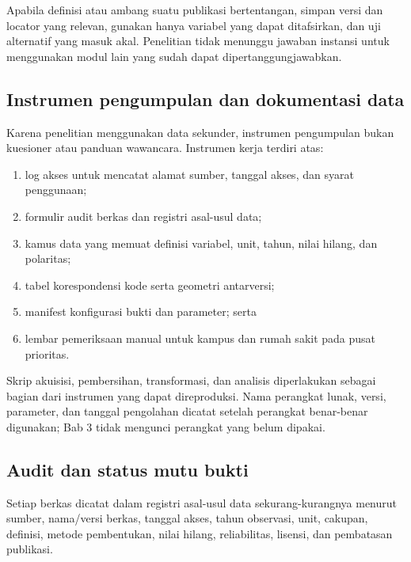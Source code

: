 \documentclass[11pt,a4paper,oneside,openany,indonesian]{report}
\begin{document}
Apabila definisi atau ambang suatu publikasi bertentangan, simpan versi
dan locator yang relevan, gunakan hanya variabel yang dapat ditafsirkan,
dan uji alternatif yang masuk akal. Penelitian tidak menunggu jawaban
instansi untuk menggunakan modul lain yang sudah dapat
dipertanggungjawabkan.

\subsection{Instrumen pengumpulan dan dokumentasi
data}\label{instrumen-pengumpulan-dan-dokumentasi-data}

Karena penelitian menggunakan data sekunder, instrumen pengumpulan bukan
kuesioner atau panduan wawancara. Instrumen kerja terdiri atas:

\begin{enumerate}
\def\labelenumi{\arabic{enumi}.}
\tightlist
\item
  log akses untuk mencatat alamat sumber, tanggal akses, dan syarat
  penggunaan;
\item
  formulir audit berkas dan registri asal-usul data;
\item
  kamus data yang memuat definisi variabel, unit, tahun, nilai hilang,
  dan polaritas;
\item
  tabel korespondensi kode serta geometri antarversi;
\item
  manifest konfigurasi bukti dan parameter; serta
\item
  lembar pemeriksaan manual untuk kampus dan rumah sakit pada pusat
  prioritas.
\end{enumerate}

Skrip akuisisi, pembersihan, transformasi, dan analisis diperlakukan
sebagai bagian dari instrumen yang dapat direproduksi. Nama perangkat
lunak, versi, parameter, dan tanggal pengolahan dicatat setelah
perangkat benar-benar digunakan; Bab 3 tidak mengunci perangkat yang
belum dipakai.

\subsection{Audit dan status mutu
bukti}\label{audit-dan-status-mutu-bukti}

Setiap berkas dicatat dalam registri asal-usul data sekurang-kurangnya
menurut sumber, nama/versi berkas, tanggal akses, tahun observasi, unit,
cakupan, definisi, metode pembentukan, nilai hilang, reliabilitas,
lisensi, dan pembatasan publikasi.
\end{document}
